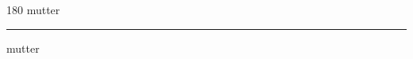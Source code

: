 
\begin{frame}
\begin{center}
\begin{turn}{180}
{\fontsize{2.5cm}{1em}\selectfont mutter}
\end{turn}
\vspace{1em}\par  
\hrule
\vspace{1em}\par  
{\fontsize{2.5cm}{1em}\selectfont mutter}
\end{center}
\end{frame}
